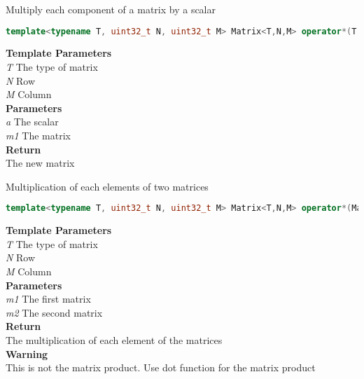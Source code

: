 \begin{mdframed}
Multiply each component of a matrix by a scalar
\begin{lstlisting}[language=C++]
template<typename T, uint32_t N, uint32_t M> Matrix<T,N,M> operator*(T a, Matrix<T,N,M> m1) 
\end{lstlisting}
\textbf{Template Parameters} \\ 
\textit{T} The type of matrix \\ 
\textit{N} Row \\ 
\textit{M} Column \\ 
\textbf{Parameters} \\ 
\textit{a} The scalar \\ 
\textit{m1} The matrix \\ 
\textbf{Return} \\ 
The new matrix\\ 
\end{mdframed}

\begin{mdframed}
Multiplication of each elements of two matrices
\begin{lstlisting}[language=C++]
template<typename T, uint32_t N, uint32_t M> Matrix<T,N,M> operator*(Matrix<T,N,M> m1, const Matrix<T,N,M>& m2) 
\end{lstlisting}
\textbf{Template Parameters} \\ 
\textit{T} The type of matrix \\ 
\textit{N} Row \\ 
\textit{M} Column \\ 
\textbf{Parameters} \\ 
\textit{m1} The first matrix \\ 
\textit{m2} The second matrix \\ 
\textbf{Return} \\ 
The multiplication of each element of the matrices\\ 
\textbf{Warning} \\ 
This is not the matrix product. Use dot function for the matrix product\\ 
\end{mdframed}

